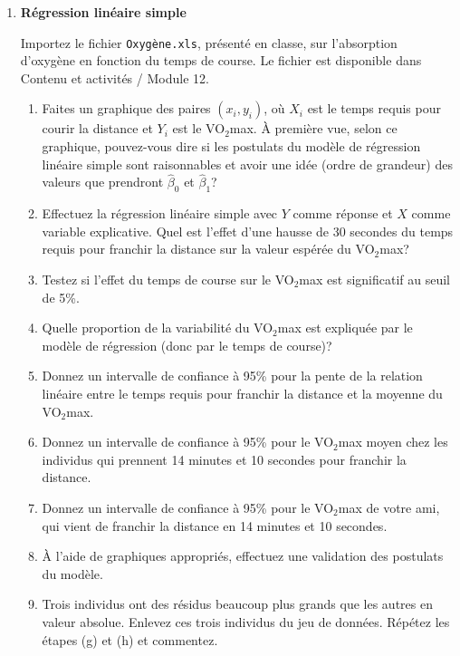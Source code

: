 \documentclass[12pt]{article}
\begin{document}
\begin{enumerate}
\newpage

{\ }
\vspace{0.05in}



\item {\bf Régression linéaire simple}

Importez le fichier {\tt Oxygène.xls}, présenté en classe, sur l'absorption d'oxygène en fonction du temps de course.  Le fichier est  disponible dans Contenu et activités / Module 12.
\begin{enumerate}
\item[(a)] Faites un graphique des paires $(x_i,y_i)$, où $X_i$ est le temps requis pour courir la distance et $Y_i$ est le VO$_2$max. À première vue, selon ce graphique, pouvez-vous dire si les postulats du modèle de régression linéaire simple sont raisonnables et avoir une idée (ordre de grandeur) des valeurs que prendront $\hat{\beta}_0$ et $\hat{\beta}_1$?
\item[(b)] Effectuez la régression linéaire simple avec $Y$ comme réponse et $X$ comme variable explicative. Quel est l'effet d'une hausse de 30 secondes du temps requis pour franchir la distance sur la valeur espérée du VO$_2$max?
\item[(c)] Testez si l'effet du temps de course sur le VO$_2$max est significatif au seuil de 5\%.
\item[(d)] Quelle proportion de la variabilité du VO$_2$max est expliquée par le modèle de régression (donc par le temps de course)?
\item[(e)] Donnez un intervalle de confiance à 95\% pour la pente de la relation linéaire entre le temps requis pour franchir la distance et la moyenne du VO$_2$max.
\item[(f)] Donnez un intervalle de confiance à 95\% pour le VO$_2$max moyen chez les individus qui prennent 14 minutes et 10 secondes pour franchir la distance.
\item[(g)] Donnez un intervalle de confiance à 95\% pour le VO$_2$max de votre ami, qui vient de franchir la distance en 14 minutes et 10 secondes.
\item[(h)] À l'aide de graphiques appropriés, effectuez une validation des postulats du modèle.
\item[(i)] Trois individus ont des résidus beaucoup plus grands que les autres en valeur absolue. Enlevez ces trois individus du jeu de données. Répétez les étapes (g) et (h) et commentez.
\end{enumerate}



\end{enumerate}
\end{document}
